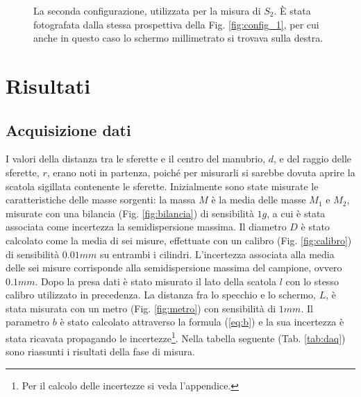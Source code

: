 \documentclass{article}
\begin{document}
\begin{figure}[h!]
\begin{minipage}[t]{0.45\textwidth}
        \caption{La seconda configurazione, utilizzata per la misura di $S_2$. È stata fotografata dalla stessa prospettiva della Fig. \ref{fig:config_1}, per cui anche in questo caso lo schermo millimetrato si trovava sulla destra.}
        \label{fig:config_2}
    \end{minipage}
\end{figure}

\section{Risultati}
\subsection{Acquisizione dati}\label{section:daq}
I valori della distanza tra le sferette e il centro del manubrio, $d$, e del raggio delle sferette, $r$, erano noti in partenza, poiché per misurarli si sarebbe dovuta aprire la scatola sigillata contenente le sferette. Inizialmente sono state misurate le caratteristiche delle masse sorgenti: la massa $M$ è la media delle masse $M_1$ e $M_2$, misurate con una bilancia (Fig. \ref{fig:bilancia}) di sensibilità $1 g$, a cui è stata associata come incertezza la semidispersione massima. Il diametro $D$ è stato calcolato come la media di sei misure, effettuate con un calibro (Fig. \ref{fig:calibro}) di sensibilità $0.01 mm$ su entrambi i cilindri. L'incertezza associata alla media delle sei misure corrisponde alla semidispersione massima del campione, ovvero $0.1 mm$. Dopo la presa dati è stato misurato il lato della scatola $l$ con lo stesso calibro utilizzato in precedenza. La distanza fra lo specchio e lo schermo, $L$, è stata misurata con un metro (Fig. \ref{fig:metro}) con sensibilità di $1 mm$. Il parametro $b$ è stato calcolato attraverso la formula (\ref{eq:b}) e la sua incertezza è stata ricavata propagando le incertezze\footnote{Per il calcolo delle incertezze si veda l'appendice.}. Nella tabella seguente (Tab. \ref{tab:daq}) sono riassunti i risultati della fase di misura.
\end{document}
